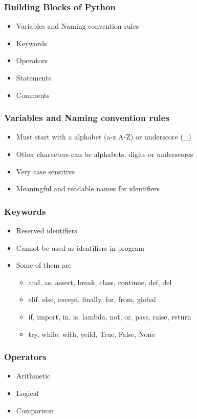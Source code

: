 \documentclass[14pt]{beamer}
\begin{document}
    \begin{frame}
      \frametitle{Building Blocks of Python}
      \begin{itemize}
                    \item Variables and Naming convention rules
                    \item Keywords
                    \item Operators
                    \item Statements
                    \item Comments
                \end{itemize}
    \end{frame}
    \begin{frame}
        \frametitle{Variables and Naming convention rules}
        \begin{itemize}
            \item Must start with a alphabet (a-z A-Z) or underscore (\_)
            \item Other characters can be alphabets, digits or underscores
            \item Very case sensitive
            \item Meaningful and readable names for identifiers
        \end{itemize}
    \end{frame}
    \begin{frame}
        \frametitle{Keywords}
        \begin{itemize}
            \item Reserved identifiers
            \item Cannot be used as identifiers in program
            \item Some of them are
                \begin{itemize}
                    \item and, as, assert, break, class, continue, def, del
                    \item elif, else, except, finally, for, from, global
                    \item if, import, in, is, lambda, not, or, pass, raise, return
                    \item try, while, with, yeild, True, False, None
                \end{itemize}
        \end{itemize}
    \end{frame}
    \begin{frame}
        \frametitle{Operators}
        \begin{itemize}
            \item Arithmetic
            \item Logical
            \item Comparison
        \end{itemize}
    \end{frame}
\end{document}
